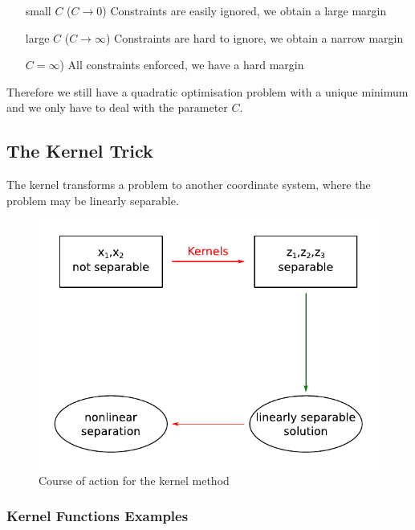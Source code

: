 \documentclass[a4paper, 11pt]{article}
\begin{document}
\begin{itemize}[leftmargin=*, labelindent=5cm, labelsep=0.5cm]
	\item[small $C$ ($C \rightarrow 0$)] Constraints are easily ignored, we obtain a large margin
	\item[large $C$ ($C \rightarrow \infty$)] Constraints are hard to ignore, we obtain a narrow margin
	\item[$C = \infty$)] All constraints enforced, we have a hard margin
\end{itemize}

Therefore we still have a quadratic optimisation problem with a unique minimum and we only have to deal with the parameter $C$.

\subsection{The Kernel Trick}

The kernel transforms a problem to another coordinate system, where the problem may be linearly separable.

\begin{figure}[htb!]
	\centering
	\includegraphics[keepaspectratio, width=0.5\linewidth]{Pictures/KernelTrick.pdf}
	\caption{Course of action for the kernel method}
	\label{fig:kerneltrick}
\end{figure}

\subsubsection{Kernel Functions Examples}
\end{document}
